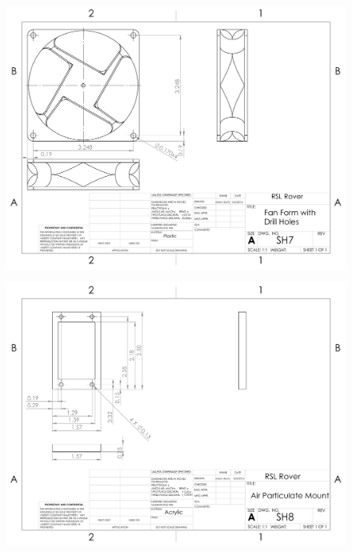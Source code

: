 \begin{figure}[H]
	\centerline{\includegraphics[angle=90,width=1.1\linewidth]{dwgs/SH7.pdf}}
\end{figure}

\begin{figure}[H]
	\centerline{\includegraphics[angle=90,width=1.1\linewidth]{dwgs/SH8.pdf}}
\end{figure}

